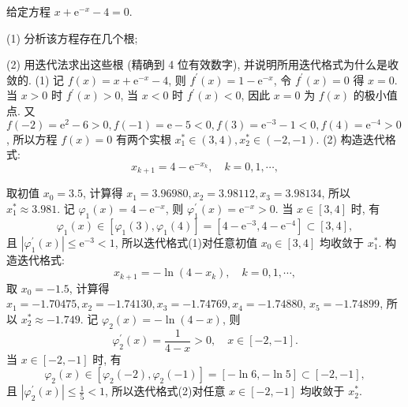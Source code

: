  \begin{tcolorbox}[enhanced,colback=green!10!white,colframe=green!50!white,breakable,coltitle=green!25!black,title=2024]
 给定方程 $ x+\mathrm{e}^{-x}-4=0 $.
 
(1) 分析该方程存在几个根;

(2) 用迭代法求出这些根 (精确到 4 位有效数字), 并说明所用迭代格式为什么是收敛的.
 \tcblower
(1) 记 $ f(x)=x+\mathrm{e}^{-x}-4 $, 则 $ f^{\prime}(x)=1-\mathrm{e}^{-x} $, 令 $ f^{\prime}(x)=0 $ 得 $ x=0 $.当 $ x>0 $ 时 $ f^{\prime}(x)>0 $, 当 $ x<0 $ 时 $ f^{\prime}(x)<0 $, 因此 $ x=0 $ 为 $ f(x) $ 的极小值点. 又 $ f(-2)=\mathrm{e}^{2}-6>0, f(-1)=\mathrm{e}-5<0, f(3)=\mathrm{e}^{-3}-1<0, f(4)=\mathrm{e}^{-4}>0 $, 所以方程 $ f(x)=0 $ 有两个实根 $ x_{1}^{*} \in(3,4), x_{2}^{*} \in(-2,-1) $.
(2) 构造迭代格式:
\begin{equation*}
    x_{k+1}=4-\mathrm{e}^{-x_{k}}, \quad k=0,1, \cdots,\tag{1}
\end{equation*}


取初值 $ x_{0}=3.5 $, 计算得 $ x_{1}=3.96980, x_{2}=3.98112, x_{3}=3.98134 $, 所以 $ x_{1}^{*} \approx 3.981 $.
记 $ \varphi_{1}(x)=4-\mathrm{e}^{-x} $, 则 $ \varphi_{1}^{\prime}(x)=\mathrm{e}^{-x}>0 $.
当 $ x \in[3,4] $ 时, 有
$$
\varphi_{1}(x) \in\left[\varphi_{1}(3), \varphi_{1}(4)\right]=\left[4-\mathrm{e}^{-3}, 4-\mathrm{e}^{-4}\right] \subset[3,4],
$$
且 $ \left|\varphi_{1}^{\prime}(x)\right| \leqslant \mathrm{e}^{-3}<1 $, 所以迭代格式(1)对任意初值 $ x_{0} \in[3,4] $ 均收敛于 $ x_{1}^{*} $.
构造迭代格式:
\begin{equation*}
    x_{k+1}=-\ln \left(4-x_{k}\right), \quad k=0,1, \cdots,\tag{2}
\end{equation*}
取 $ x_{0}=-1.5 $, 计算得 $ x_{1}=-1.70475, x_{2}=-1.74130, x_{3}=-1.74769, x_{4}=-1.74880 $, $ x_{5}=-1.74899 $, 所以 $ x_{2}^{*} \approx-1.749 $.
记 $ \varphi_{2}(x)=-\ln (4-x) $, 则
$$
\varphi_{2}^{\prime}(x)=\frac{1}{4-x}>0, \quad x \in[-2,-1] .
$$
当 $ x \in[-2,-1] $ 时, 有
$$
\varphi_{2}(x) \in\left[\varphi_{2}(-2), \varphi_{2}(-1)\right]=[-\ln 6,-\ln 5] \subset[-2,-1],
$$
且 $ \left|\varphi_{2}^{\prime}(x)\right| \leqslant \frac{1}{5}<1 $, 所以迭代格式(2)对任意 $ x \in[-2,-1] $ 均收敛于 $ x_{2}^{*} $.
 \end{tcolorbox}



